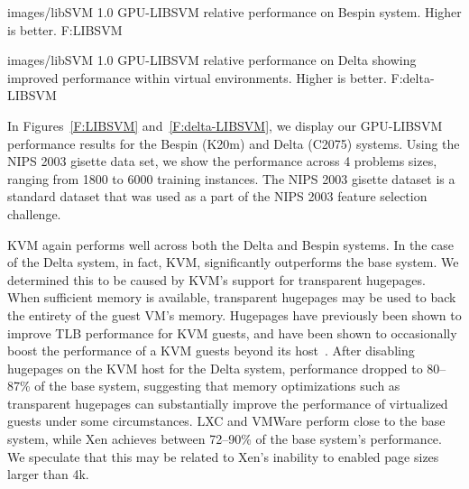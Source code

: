   {images/libSVM}
  {1.0}
  {GPU-LIBSVM relative performance on Bespin system.  Higher is better.}
  {F:LIBSVM} 

  {images/libSVM}
  {1.0}
  {GPU-LIBSVM relative performance on Delta showing improved performance
within virtual environments.  Higher is better.}
  {F:delta-LIBSVM} 





In Figures~\ref{F:LIBSVM} and~\ref{F:delta-LIBSVM}, we display our GPU-LIBSVM performance results for the
Bespin (K20m) and Delta (C2075) systems. Using the NIPS 2003 gisette data set, we show the
performance across 4 problems sizes, ranging from 1800 to 6000 training
instances. The NIPS 2003 gisette dataset is a standard dataset that was used as a part of
the NIPS 2003 feature selection challenge. 

KVM again performs well across both the Delta and Bespin systems.  In the case
of the Delta system, in fact, KVM, significantly outperforms the base
system.  We determined this to be caused by KVM's support for transparent
hugepages.  When sufficient memory is available, transparent hugepages may be
used to back the entirety of the guest VM's memory.  Hugepages have previously
been shown to improve TLB performance for KVM guests, and have been shown to
occasionally boost the performance of a KVM guests beyond its
host~\cite{Arcangeli:2010}.  After disabling hugepages on the KVM host for the
Delta system, performance dropped to 80--87\% of the base system, suggesting that
memory optimizations such as transparent hugepages can substantially improve the
performance of virtualized guests under some circumstances.  LXC and VMWare
perform close to the base system, while Xen achieves between 72--90\% of the
base system's performance.  We speculate that this may be related to Xen's
inability to enabled page sizes larger than 4k.

